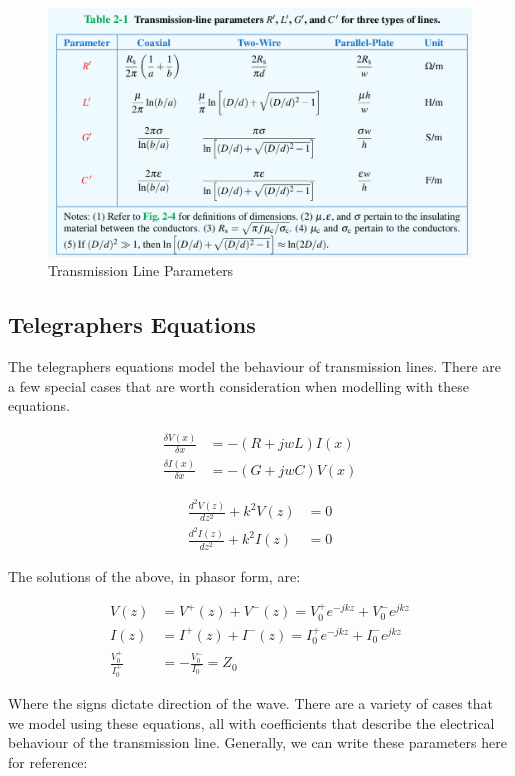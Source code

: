 \documentclass{book}
\begin{document}
\begin{figure}
	\centering
	\includegraphics[width=0.5\linewidth]{Screenshots/transmission_line_parameters}
	\caption{Transmission Line Parameters	}
	\label{fig:transmissionlineparameters}
\end{figure}

\subsection{Telegraphers Equations}

The telegraphers equations model the behaviour of transmission lines. There are a few special cases that are worth consideration when modelling with these equations.

\begin{align*}
	\frac{\delta V(x)}{\delta x} &= -(R + jwL) I(x )\\
	\frac{\delta I(x)}{\delta x} & = -(G + jwC) V(x) 
\end{align*}

\begin{align*}
	\frac{d^2 V(z)}{dz^2} + k^2 V(z) &= 0\\
	\frac{d^2 I(z)}{dz^2} + k^2 I(z) &= 0 
\end{align*}

The solutions of the above, in phasor form, are:

\begin{align*}
	V(z) &= V^+(z) +V^-(z) = V_0^+ e^{-jkz}+V_0^- e^{jkz} \\
	I(z) &= I^+(z) +I^-(z) = I_0^+ e^{-jkz}+I_0^- e^{jkz} \\
	\frac{V_0^+}{I_0^+} &= -\frac{V_0 ^-}{I_0 ^-}= Z_0
\end{align*}

Where the signs dictate direction of the wave. There are a variety of cases that we model using these equations, all with coefficients that describe the electrical behaviour of the transmission line. Generally, we can write these parameters here for reference:
\end{document}
